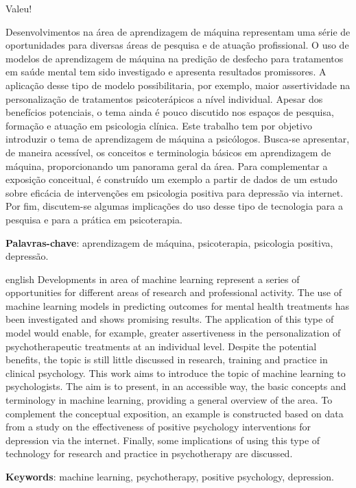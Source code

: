 \documentclass[
	12pt,				        %
	openany,			        %
	oneside,			        %
	a4paper,			        %
	english,			        %
	brazil				        %
	]{abntex2}
\begin{document}
\begin{agradecimentos}
Valeu!
\end{agradecimentos}


\setlength{\absparsep}{18pt} %
\begin{resumo}
Desenvolvimentos na área de aprendizagem de máquina representam uma série de oportunidades para diversas áreas de pesquisa e de atuação profissional.
O uso de modelos de aprendizagem de máquina na predição de desfecho para tratamentos em saúde mental tem sido investigado e apresenta resultados promissores.
A aplicação desse tipo de modelo possibilitaria, por exemplo, maior assertividade na personalização de tratamentos psicoterápicos a nível individual.
Apesar dos benefícios potenciais, o tema ainda é pouco discutido nos espaços de pesquisa, formação e atuação em psicologia clínica. Este trabalho tem
por objetivo introduzir o tema de aprendizagem de máquina a psicólogos. Busca-se apresentar, de maneira acessível, os conceitos e terminologia básicos
em aprendizagem de máquina, proporcionando um panorama geral da área. Para complementar a exposição conceitual, é construído um exemplo a partir de dados
de um estudo sobre eficácia de intervenções em psicologia positiva para depressão via internet. Por fim, discutem-se algumas implicações do uso desse tipo
de tecnologia para a pesquisa e para a prática em psicoterapia.

 \textbf{Palavras-chave}: aprendizagem de máquina, psicoterapia, psicologia positiva, depressão.
\end{resumo}

\begin{resumo}[Abstract]
 \begin{otherlanguage*}{english}
   Developments in area of machine learning represent a series of opportunities for different areas of research and professional activity. The use of machine
   learning models in predicting outcomes for mental health treatments has been investigated and shows promising results. The application of this type of model would
   enable, for example, greater assertiveness in the personalization of psychotherapeutic treatments at an individual level. Despite the potential benefits, the topic
   is still little discussed in research, training and practice in clinical psychology. This work aims to introduce the topic of machine learning to psychologists. The
   aim is to present, in an accessible way, the basic concepts and terminology in machine learning, providing a general overview of the area. To complement the conceptual
   exposition, an example is constructed based on data from a study on the effectiveness of positive psychology interventions for depression via the internet. Finally,
   some implications of using this type of technology for research and practice in psychotherapy are discussed.
   \vspace{\onelineskip}
 
   \noindent 
   \textbf{Keywords}: machine learning, psychotherapy, positive psychology, depression.
 \end{otherlanguage*}
\end{resumo}
\end{document}
